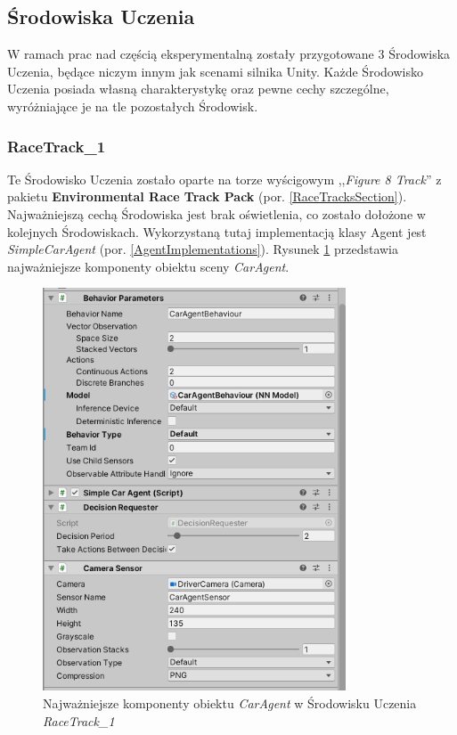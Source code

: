 \clearpage
\subsection{Środowiska Uczenia}
\label{LearningEnvsSubsection}
W ramach prac nad częścią eksperymentalną zostały przygotowane 3 Środowiska Uczenia, będące niczym innym jak scenami silnika Unity. Każde Środowisko Uczenia posiada własną charakterystykę oraz pewne cechy szczególne, wyróżniające je na tle pozostałych Środowisk.

\subsubsection{RaceTrack\_1}
Te Środowisko Uczenia zostało oparte na torze wyścigowym ,,\textit{Figure 8 Track}'' z pakietu \textbf{Environmental Race Track Pack} (por. \ref{RaceTracksSection}). Najważniejszą cechą Środowiska jest brak oświetlenia, co zostało dołożone w kolejnych Środowiskach. Wykorzystaną tutaj implementacją klasy Agent jest \textit{SimpleCarAgent} (por. \ref{AgentImplementations}). Rysunek \ref{RaceTrack1AgentComps} przedstawia najważniejsze komponenty obiektu sceny \textit{CarAgent}. \\
\begin{figure}[h]
\begin{center}
\includegraphics[width=9cm]{resources/figures/race_track_1_agent_components.png}
\caption{Najważniejsze komponenty obiektu \textit{CarAgent} w Środowisku Uczenia \textit{RaceTrack\_1}}
\label{RaceTrack1AgentComps}
\end{center}
\end{figure}
